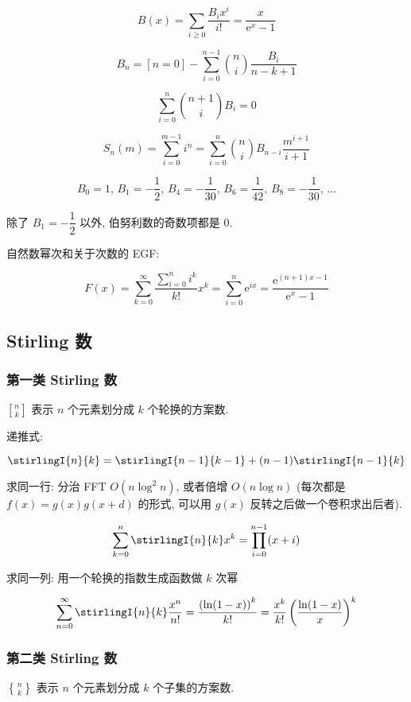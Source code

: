 \[
    B(x)=\sum_{i\ge 0}\frac{B_i x^i}{i!}=\frac x{\mathrm{e}^x-1}
\]

\[
    B_n=[n=0]-\sum_{i=0}^{n-1}\binom{n}{i}\frac{B_i}{n-k+1}
\]

\[
    \sum_{i=0}^n\binom{n+1}{i}B_i=0
\]

\[
    S_n(m)=\sum_{i=0}^{m-1}i^n=\sum_{i=0}^n\binom{n}{i}B_{n-i}\frac{m^{i+1}}{i+1}
\]

\[
    B_0 = 1, \, B_1 = -\frac{1}{2}, \, B_4 = -\frac{1}{30}, \, B_6 = \frac{1}{42}, \, B_8 = -\frac{1}{30}, \, \dots
\]

除了 \(B_1 = -\dfrac{1}{2}\) 以外, 伯努利数的奇数项都是 \(0\).

自然数幂次和关于次数的 EGF:

\[
    F(x)=\sum_{k=0}^\infty \frac{\sum_{i=0}^n i^k}{k!}x^k=\sum_{i=0}^n \mathrm{e}^{ix}=\frac{\mathrm{e}^{(n+1)x-1}}{\mathrm{e}^x-1}
\]

\subsection{Stirling 数}
\label{sec:stirling-数}

\subsubsection{第一类 Stirling 数}
\label{ssec:第一类-stirling-数}

\(n\brack k\) 表示 \(n\) 个元素划分成 \(k\) 个轮换的方案数.

递推式:

\[
    \stirlingI{n}{k} = \stirlingI{n-1}{k-1} + (n-1)\stirlingI{n-1}{k}
\]

求同一行: 分治 FFT \(O(n\log ^2 n)\), 或者倍增 \(O(n\log n)\) (每次都是 \(f(x) = g(x) g(x + d)\) 的形式, 可以用 \(g(x)\) 反转之后做一个卷积求出后者).

\[
    \sum_{k = 0}^n \stirlingI{n}{k} x^k = \prod_{i = 0}^{n - 1} (x + i)
\]

求同一列: 用一个轮换的指数生成函数做 \(k\) 次幂

\[
    \sum_{n = 0}^\infty \stirlingI{n}{k} \frac{x^n}{n!} = \frac{\left(\ln (1 - x)\right)^k}{k!} = \frac{x^k}{k!} \left( \frac{\ln (1 - x)}{x} \right)^k
\]

\subsubsection{第二类 Stirling 数}
\label{ssec:第二类-stirling-数}

\(n\brace k\) 表示 \(n\) 个元素划分成 \(k\) 个子集的方案数.

